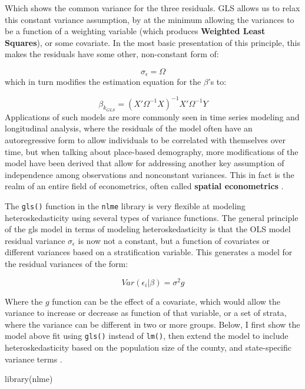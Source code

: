\documentclass[
]{article}
\newenvironment{Shaded}{\begin{snugshade}}{\end{snugshade}}
\newcommand{\FunctionTok}[1]{\textcolor[rgb]{0.00,0.00,0.00}{#1}}
\newcommand{\NormalTok}[1]{#1}
\begin{document}
Which shows the common variance for the three residuals. GLS allows us to relax this constant variance assumption, by at the minimum allowing the variances to be a function of a weighting variable (which produces \textbf{Weighted Least Squares}), or some covariate. In the most basic presentation of this principle, this makes the residuals have some other, non-constant form of:

\[\sigma_{\epsilon}  = \Omega\] which in turn modifies the estimation equation for the \(\beta\)'s to:

\[\beta_{k_{GLS}} = (X' \Omega^{-1} X)^{-1} X' \Omega^{-1} Y\] Applications of such models are more commonly seen in time series modeling and longitudinal analysis, where the residuals of the model often have an autoregressive form to allow individuals to be correlated with themselves over time, but when talking about place-based demography, more modifications of the model have been derived that allow for addressing another key assumption of independence among observations and nonconstant variances. This in fact is the realm of an entire field of econometrics, often called \textbf{spatial econometrics} \citep{anselin_spatial_1988, chi_spatial_2020, elhorst_spatial_2014, lesage_introduction_2009}.

The \texttt{gls()} function in the \texttt{nlme} library is very flexible at modeling heteroskedasticity using several types of variance functions. The general principle of the gls model in terms of modeling heteroskedasticity is that the OLS model residual variance \(\sigma_{\epsilon}\) is now not a constant, but a function of covariates or different variances based on a stratification variable. This generates a model for the residual variances of the form:

\[Var(\epsilon_i |\beta) = \sigma^2 g\]

Where the \(g\) function can be the effect of a covariate, which would allow the variance to increase or decrease as function of that variable, or a set of strata, where the variance can be different in two or more groups. Below, I first show the model above fit using \texttt{gls()} instead of \texttt{lm()}, then extend the model to include heteroskedasticity based on the population size of the county, and state-specific variance terms \citep{pinheiro_mixed-effects_2000}.

\begin{Shaded}
\begin{Highlighting}[]
\FunctionTok{library}\NormalTok{(nlme)}
\end{Highlighting}
\end{Shaded}
\end{document}
